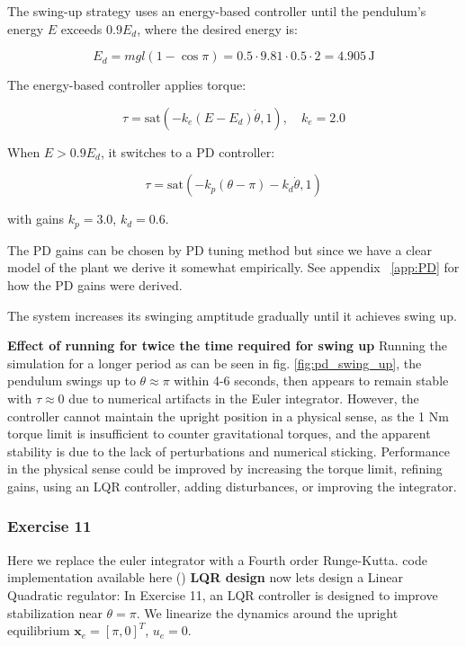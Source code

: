 \documentclass[12pt,a4paper]{article}
\begin{document}
The swing-up strategy uses an energy-based controller until the pendulum’s energy \( E \) exceeds \( 0.9 E_d \), where the desired energy is:

\begin{equation}
E_d = m g l (1 - \cos \pi) = 0.5 \cdot 9.81 \cdot 0.5 \cdot 2 = 4.905 \, \text{J}
\end{equation}

The energy-based controller applies torque:

\begin{equation}
\tau = \text{sat}(-k_e (E - E_d) \dot{\theta}, 1), \quad k_e = 2.0
\end{equation}

When \( E > 0.9 E_d \), it switches to a PD controller:

\begin{equation}
\tau = \text{sat}(-k_p (\theta - \pi) - k_d \dot{\theta}, 1)
\end{equation}

with gains \( k_p = 3.0 \), \( k_d = 0.6 \).

The PD gains can be chosen by PD tuning method but since we have a clear model of the plant we derive it somewhat empirically. See appendix ~\ref{app:PD} for how the PD gains were derived.



The system increases its swinging amptitude gradually until it achieves swing up.

\textbf{Effect of running for twice the time required for swing up}
Running the simulation for a longer period as can be seen in fig. \ref{fig:pd_swing_up}, the pendulum swings up to $\theta \approx \pi$ within 4-6 seconds, then appears to remain stable with $\tau \approx 0$ due to numerical artifacts in the Euler integrator. However, the controller cannot maintain the upright position in a physical sense, as the 1 Nm torque limit is insufficient to counter gravitational torques, and the apparent stability is due to the lack of perturbations and numerical sticking. Performance in the physical sense could be improved by increasing the torque limit, refining gains, using an LQR controller, adding disturbances, or improving the integrator.




\subsubsection*{Exercise 11}\label{sec:lqr}
Here we replace the euler integrator with a Fourth order Runge-Kutta. code implementation available here ()
\textbf{LQR design}
now lets design a Linear Quadratic regulator:
In Exercise 11, an LQR controller is designed to improve stabilization near \( \theta = \pi \). We linearize the dynamics around the upright equilibrium \( \mathbf{x}_e = [\pi, 0]^T \), \( u_e = 0 \).
\end{document}
